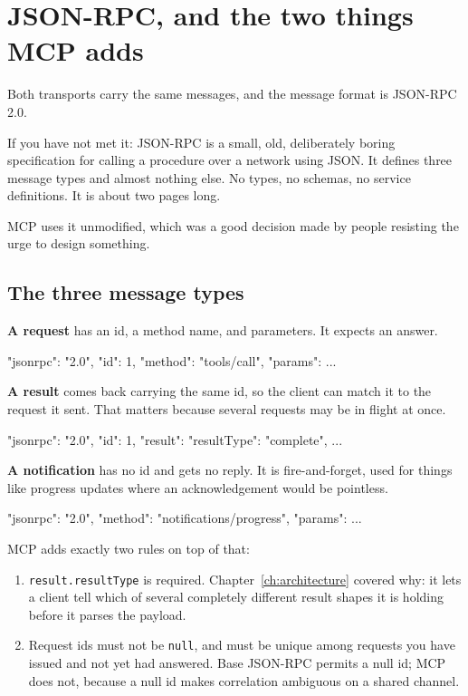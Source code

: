 \section{JSON-RPC, and the two things MCP adds}

Both transports carry the same messages, and the message format is JSON-RPC 2.0.

If you have not met it: JSON-RPC is a small, old, deliberately boring
specification for calling a procedure over a network using JSON. It defines
three message types and almost nothing else. No types, no schemas, no service
definitions. It is about two pages long.

MCP uses it unmodified, which was a good decision made by people resisting the
urge to design something.

\subsection{The three message types}

\textbf{A request} has an id, a method name, and parameters. It expects an
answer.

\begin{wire}
{ "jsonrpc": "2.0", "id": 1, "method": "tools/call", "params": { ... } }
\end{wire}

\textbf{A result} comes back carrying the same id, so the client can match it to
the request it sent. That matters because several requests may be in flight at
once.

\begin{wire}
{ "jsonrpc": "2.0", "id": 1, "result": { "resultType": "complete", ... } }
\end{wire}

\textbf{A notification} has no id and gets no reply. It is fire-and-forget, used
for things like progress updates where an acknowledgement would be pointless.

\begin{wire}
{ "jsonrpc": "2.0", "method": "notifications/progress", "params": { ... } }
\end{wire}

MCP adds exactly two rules on top of that:

\begin{enumerate}[leftmargin=1.6em, itemsep=4pt]
\item \texttt{result.resultType} is required. Chapter~\ref{ch:architecture}
covered why: it lets a client tell which of several completely different result
shapes it is holding before it parses the payload.
\item Request ids must not be \texttt{null}, and must be unique among requests
you have issued and not yet had answered. Base JSON-RPC permits a null id; MCP
does not, because a null id makes correlation ambiguous on a shared channel.
\end{enumerate}

